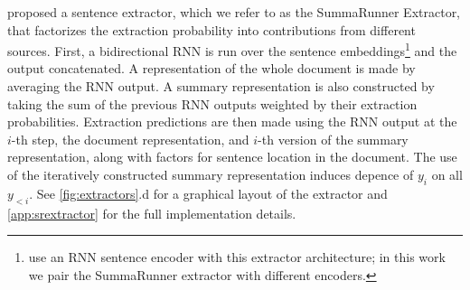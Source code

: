 
\citet{nallapati2017summarunner} proposed
a sentence extractor, which we refer to as the SummaRunner Extractor,
that factorizes the extraction probability into contributions 
from different sources.
First, a bidirectional RNN is run over the sentence embeddings\footnote{\citet{nallapati2017summarunner}
    use an RNN sentence encoder with 
this extractor architecture; in this work we pair the SummaRunner extractor
with different encoders. } and the output
concatenated. A representation of the whole document is made by 
averaging the RNN output. A summary representation is also constructed 
by taking the sum of the previous RNN outputs weighted by their extraction
probabilities. Extraction predictions are then made using 
the RNN output at the $i$-th step, the document representation, and 
$i$-th version of the summary representation, along with factors for 
sentence location in the document. The use of the iteratively constructed
summary representation induces depence of $y_i$ on all $y_{<i}$.
See \autoref{fig:extractors}.d for a graphical layout of the extractor
and \autoref{app:srextractor} for the full implementation details.



